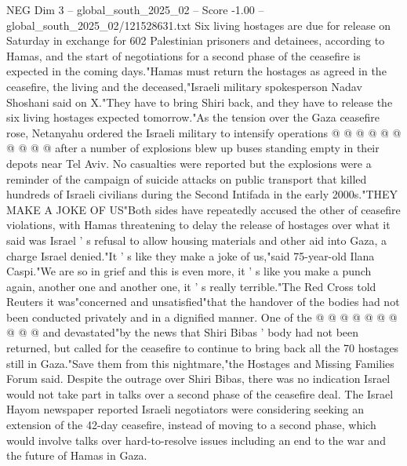 \begin{textsample}{NEG Dim 3 – global\_south\_2025\_02 – Score -1.00 – global\_south\_2025\_02/121528631.txt}
Six living hostages are due for release on Saturday in exchange for 602 Palestinian prisoners and detainees, according to Hamas, and the start of negotiations for a second phase of the ceasefire is expected in the coming days."Hamas must return the hostages as agreed in the ceasefire, the living and the deceased,"Israeli military spokesperson Nadav Shoshani said on X."They have to bring Shiri back, and they have to release the six living hostages expected tomorrow."As the tension over the Gaza ceasefire rose, Netanyahu ordered the Israeli military to intensify operations @ @ @ @ @ @ @ @ @ @ after a number of explosions blew up buses standing empty in their depots near Tel Aviv.
No casualties were reported but the explosions were a reminder of the campaign of suicide attacks on public transport that killed hundreds of Israeli civilians during the Second Intifada in the early 2000s."THEY MAKE A JOKE OF US"Both sides have repeatedly accused the other of ceasefire violations, with Hamas threatening to delay the release of hostages over what it said was Israel ' s refusal to allow housing materials and other aid into Gaza, a charge Israel denied."It ' s like they make a joke of us,"said 75-year-old Ilana Caspi."We are so in grief and this is even more, it ' s like you make a punch again, another one and another one, it ' s really terrible."The Red Cross told Reuters it was"concerned and unsatisfied"that the handover of the bodies had not been conducted privately and in a dignified manner.
One of the @ @ @ @ @ @ @ @ @ @ and devastated"by the news that Shiri Bibas ' body had not been returned, but called for the ceasefire to continue to bring back all the 70 hostages still in Gaza."Save them from this nightmare,"the Hostages and Missing Families Forum said.
Despite the outrage over Shiri Bibas, there was no indication Israel would not take part in talks over a second phase of the ceasefire deal.
The Israel Hayom newspaper reported Israeli negotiators were considering seeking an extension of the 42-day ceasefire, instead of moving to a second phase, which would involve talks over hard-to-resolve issues including an end to the war and the future of Hamas in Gaza.

\end{textsample}
